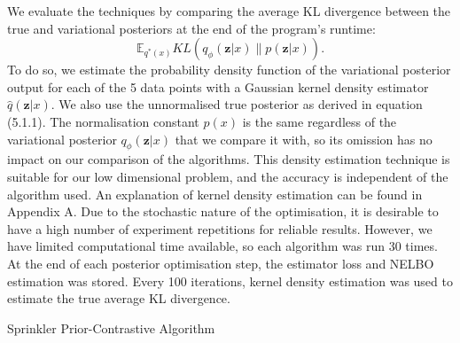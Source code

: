 \documentclass[honours,12pt]{unswthesis}
\newcommand{\E}{\mathbb{E}}
\numberwithin{equation}{section}
\theoremstyle{definition}
\begin{document}
We evaluate the techniques by comparing the average KL divergence between the true and variational posteriors at the end of the program's runtime: \[\E_{q^*(x)}KL(q_\phi(\bm{z}|x)\|p(\bm{z}|x)).\] To do so, we estimate the probability density function of the variational posterior output for each of the 5 data points with a Gaussian kernel density estimator $\hat{q}(\bm{z}|x)$. We also use the unnormalised true posterior as derived in equation (5.1.1). The normalisation constant $p(x)$ is the same regardless of the variational posterior $q_\phi(\bm{z}|x)$ that we compare it with, so its omission has no impact on our comparison of the algorithms. This density estimation technique is suitable for our low dimensional problem, and the accuracy is independent of the algorithm used. An explanation of kernel density estimation can be found in Appendix A. Due to the stochastic nature of the optimisation, it is desirable to have a high number of experiment repetitions for reliable results. However, we have limited computational time available, so each algorithm was run 30 times. At the end of each posterior optimisation step, the estimator loss and NELBO estimation was stored. Every 100 iterations, kernel density estimation was used to estimate the true average KL divergence.
\begin{algorithm}
\caption{Sprinkler Prior-Contrastive Algorithm}
\BlankLine
{}
\end{algorithm}
\end{document}
